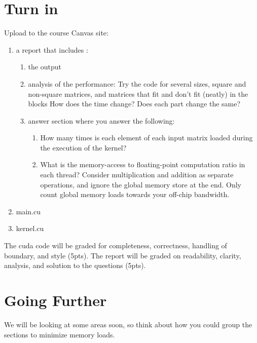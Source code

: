 \documentclass{article}
\begin{document}
\section{Turn in}
Upload to the course Canvas site:
\begin{enumerate}
\item a report that includes :
	\begin{enumerate}
	\item the output 
	\item analysis of the performance: Try the code for several sizes, square and non-square matrices, and matrices that fit and don't fit (neatly) in the blocks  How does the time change?  Does each part change the same?
	\item answer section where you answer the following:
		\begin{enumerate}
		\item How many times is each element of each input matrix loaded during the execution of the kernel?
		\item What is the memory-access to floating-point computation ratio in each thread? Consider multiplication and addition as separate operations, and ignore the global memory store at the end. Only count global memory loads towards your off-chip bandwidth.
		\end{enumerate}
	\end{enumerate}
\item main.cu
\item kernel.cu
\end{enumerate} 
The cuda code will be graded for completeness, correctness, handling of boundary, and style (5pts).  The report will be graded on readability, clarity, analysis, and solution to the questions (5pts).


\section{Going Further}
We will be looking at some areas soon, so think about how you could group the sections to minimize memory loads.
\end{document}

